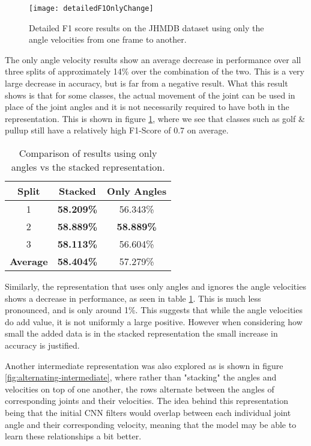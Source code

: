 \begin{figure}[ht]
	\texttt{[image: detailedF1OnlyChange]}
	\centering
	\caption{Detailed F1 score results on the JHMDB dataset using only the angle velocities from one frame to another.}
	\label{fig:detailed-f1-only-change}
\end{figure}

The only angle velocity results show an average decrease in performance over all three splits of approximately 14\% over the combination of the two. This is a very large decrease in accuracy, but is far from a negative result. What this result shows is that for some classes, the actual movement of the joint can be used in place of the joint angles and it is not necessarily required to have both in the representation. This is shown in figure \ref{fig:detailed-f1-only-change}, where we see that classes such as golf \& pullup still have a relatively high F1-Score of 0.7 on average.

\begin{table}[ht]
	\centering
	\begin{tabular}{||c c c||} 
		\hline
		\textbf{Split} & \textbf{Stacked} & \textbf{Only Angles} \\ [0.5ex] 
		\hline\hline
		1 & \textbf{58.209\%} & 56.343\% \\ 
		\hline
		2 & \textbf{58.889\%} & \textbf{58.889\%} \\
		\hline
		3 & \textbf{58.113\%} & 56.604\% \\
		\hline
		\hline
		\textbf{Average} & \textbf{58.404\%} & 57.279\% \\
		\hline
	\end{tabular}
	\caption{Comparison of results using only angles vs the stacked representation.}
	\label{tab:acc-results-v-angle}
\end{table}

Similarly, the representation that uses only angles and ignores the angle velocities shows a decrease in performance, as seen in table \ref{tab:acc-results-v-angle}. This is much less pronounced, and is only around 1\%. This suggests that while the angle velocities do add value, it is not uniformly a large positive. However when considering how small the added data is in the stacked representation the small increase in accuracy is justified.

Another intermediate representation was also explored as is shown in figure \ref{fig:alternating-intermediate}, where rather than "stacking" the angles and velocities on top of one another, the rows alternate between the angles of corresponding joints and their velocities. The idea behind this representation being that the initial CNN filters would overlap between each individual joint angle and their corresponding velocity, meaning that the model may be able to learn these relationships a bit better.

